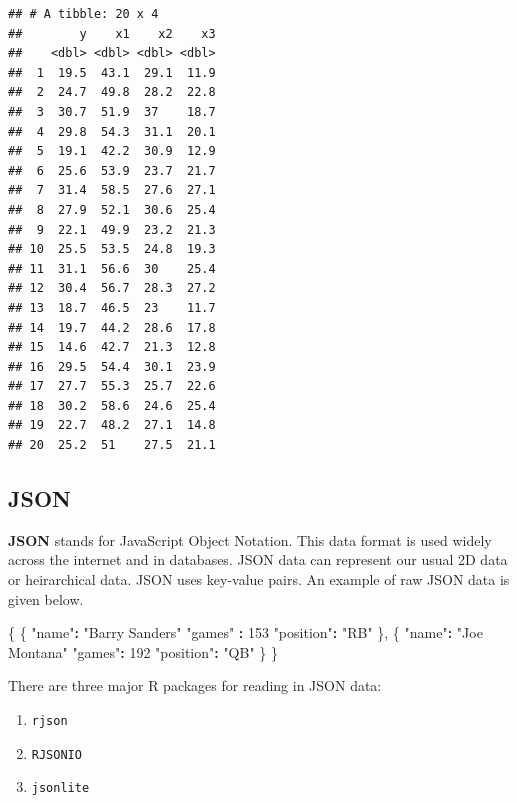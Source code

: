 \documentclass[
]{book}
\newenvironment{Shaded}{\begin{snugshade}}{\end{snugshade}}
\newcommand{\DecValTok}[1]{\textcolor[rgb]{0.00,0.00,0.81}{#1}}
\newcommand{\NormalTok}[1]{#1}
\newcommand{\OperatorTok}[1]{\textcolor[rgb]{0.81,0.36,0.00}{\textbf{#1}}}
\newcommand{\StringTok}[1]{\textcolor[rgb]{0.31,0.60,0.02}{#1}}
\theoremstyle{definition}
\theoremstyle{definition}
\theoremstyle{definition}
\theoremstyle{remark}
\begin{document}
\begin{verbatim}
## # A tibble: 20 x 4
##        y    x1    x2    x3
##    <dbl> <dbl> <dbl> <dbl>
##  1  19.5  43.1  29.1  11.9
##  2  24.7  49.8  28.2  22.8
##  3  30.7  51.9  37    18.7
##  4  29.8  54.3  31.1  20.1
##  5  19.1  42.2  30.9  12.9
##  6  25.6  53.9  23.7  21.7
##  7  31.4  58.5  27.6  27.1
##  8  27.9  52.1  30.6  25.4
##  9  22.1  49.9  23.2  21.3
## 10  25.5  53.5  24.8  19.3
## 11  31.1  56.6  30    25.4
## 12  30.4  56.7  28.3  27.2
## 13  18.7  46.5  23    11.7
## 14  19.7  44.2  28.6  17.8
## 15  14.6  42.7  21.3  12.8
## 16  29.5  54.4  30.1  23.9
## 17  27.7  55.3  25.7  22.6
## 18  30.2  58.6  24.6  25.4
## 19  22.7  48.2  27.1  14.8
## 20  25.2  51    27.5  21.1
\end{verbatim}

\hypertarget{json}{%
\subsection{JSON}\label{json}}

\textbf{JSON} stands for JavaScript Object Notation. This data format is used widely across the internet and in databases. JSON data can represent our usual 2D data or heirarchical data. JSON uses key-value pairs. An example of raw JSON data is given below.

\begin{Shaded}
\begin{Highlighting}[]
\NormalTok{\{  }
\NormalTok{  \{  }
    \StringTok{"name"}\OperatorTok{:}\StringTok{ "Barry Sanders"}  
    \StringTok{"games"} \OperatorTok{:}\StringTok{ }\DecValTok{153}  
    \StringTok{"position"}\OperatorTok{:}\StringTok{ "RB"}  
\NormalTok{  \},  }
\NormalTok{  \{  }
    \StringTok{"name"}\OperatorTok{:}\StringTok{ "Joe Montana"}  
    \StringTok{"games"}\OperatorTok{:}\StringTok{ }\DecValTok{192}  
    \StringTok{"position"}\OperatorTok{:}\StringTok{ "QB"}  
\NormalTok{  \}  }
\NormalTok{\} }
\end{Highlighting}
\end{Shaded}

There are three major R packages for reading in JSON data:

\begin{enumerate}
\def\labelenumi{\arabic{enumi}.}
\item
  \texttt{rjson}
\item
  \texttt{RJSONIO}
\item
  \texttt{jsonlite}
\end{enumerate}
\end{document}
